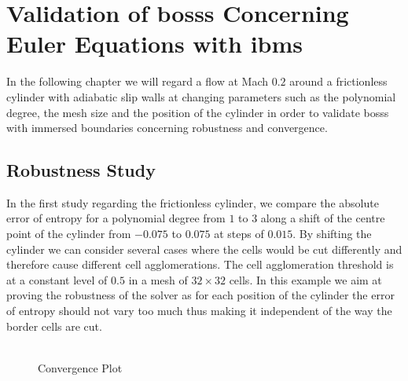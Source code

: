 \chapter{Validation of \gls{bosss} Concerning Euler Equations with \gls{ibm}s}
	\label{eulerVerification}
	In the following chapter we will regard a flow at Mach $0.2$ around a frictionless cylinder with adiabatic slip walls at changing parameters such as the polynomial degree, the mesh size and the position of the cylinder in order to validate \gls{bosss} with immersed boundaries concerning robustness and convergence.

	\section{Robustness Study}
	In the first study regarding the frictionless cylinder, we compare the absolute error of entropy for a polynomial degree from $1$ to $3$ along a shift of the centre point of the cylinder from $-0.075$ to $0.075$ at steps of $0.015$. By shifting the cylinder we can consider several cases where the cells would be cut differently and therefore cause different cell agglomerations. The cell agglomeration threshold is at a constant level of $0.5$ in a mesh of $32 \times 32$ cells. In this example we aim at proving the robustness of the solver as for each position of the cylinder the error of entropy should not vary too much thus making it independent of the way the border cells are cut. \\ \\

	\begin{figure}[htp]	
		\centering
		\caption{Convergence Plot}
		\label{shifterror}
	\end{figure}
	

